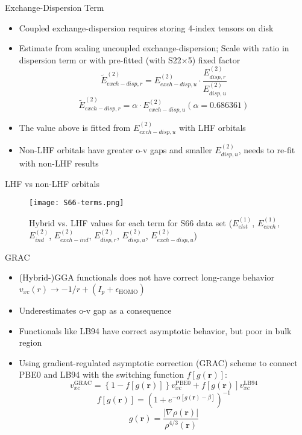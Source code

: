 \documentclass{beamer}
\begin{document}
        \begin{frame}{Exchange-Dispersion Term}
            \begin{itemize}
                \item Coupled exchange-dispersion requires storing 4-index tensors on disk
                \item Estimate from scaling uncoupled exchange-dispersion; Scale with ratio in dispersion term or with pre-fitted (with S22$\times$5) fixed factor 
                $$\tilde{E}^{(2)}_{exch-disp,r} = E^{(2)}_{exch-disp,u} \cdot \frac{E^{(2)}_{disp,r}}{E^{(2)}_{disp,u}}$$
                $$\tilde{E}^{(2)}_{exch-disp,r} = \alpha \cdot E^{(2)}_{exch-disp,u} (\alpha = 0.686361)$$
                \item The value above is fitted from $E_{exch-disp,u}^{(2)}$ with LHF orbitals
                \item Non-LHF orbitals have greater o-v gaps and smaller $E_{disp,u}^{(2)}$, needs to re-fit with non-LHF results
            \end{itemize}
        \end{frame}

        \begin{frame}{LHF vs non-LHF orbitals}
            \begin{figure}
            \centering
            \texttt{[image: S66-terms.png]}
            \caption{Hybrid vs. LHF values for each term for S66 data set ($E_{elst}^{(1)}$, $E_{exch}^{(1)}$, $E_{ind}^{(2)}$, $E_{exch-ind}^{(2)}$, $E_{disp,r}^{(2)}$, $E_{disp,u}^{(2)}$, $E_{exch-disp,u}^{(2)}$)} 
            \end{figure}        
        \end{frame}

        \begin{frame}{GRAC}
            \begin{itemize}
                \item (Hybrid-)GGA functionals does not have correct long-range behavior $v_{xc}(r) \rightarrow -1/r + (I_p + \epsilon_{\text{HOMO}})$
                \item Underestimates o-v gap as a consequence
                \item Functionals like LB94 have correct asymptotic behavior, but poor in bulk region
                \item Using gradient-regulated asymptotic correction (GRAC) scheme to connect PBE0 and LB94 with the switching function $f[g(\boldsymbol{r})]$:
                $$v_{xc}^{\text{GRAC}} = \left\{1-f[g(\boldsymbol{r})]\right\}v_{xc}^{\text{PBE0}} + f[g(\boldsymbol{r})] v_{xc}^{\text{LB94}}$$
                $$f[g(\boldsymbol{r})] = \left( 1+e^{-\alpha [g(\boldsymbol{r}) - \beta]} \right)^{-1}$$
                $$g(\boldsymbol{r}) = \frac{\left| \nabla \rho (\boldsymbol{r}) \right|}{\rho^{4/3}(\boldsymbol{r})}$$
            \end{itemize}
        \end{frame}        
        
\end{document}
